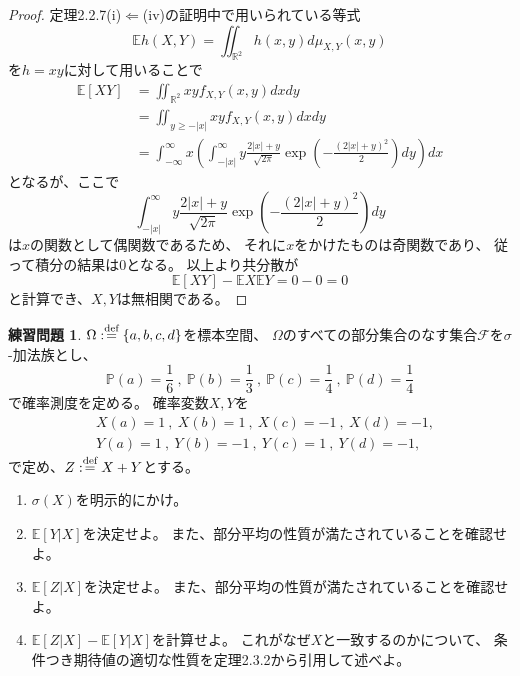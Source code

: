 \documentclass[uplatex]{jsarticle}
\theoremstyle{definition}
\newtheorem{prob}[prob]{練習問題}
\def\R{\mathbb{R}}
\def\P{\mathbb{P}}
\def\E{\mathbb{E}}
\def\mcF{\mathcal{F}}
\def\dfn{:\overset{\mbox{{\scriptsize def}}}{=}}
\begin{document}
\begin{proof}
  定理2.2.7(i)\(\Leftarrow\)(iv)の証明中で用いられている等式
  \[
  \E h(X,Y) = \iint_{\R^2}h(x,y)d\mu_{X,Y}(x,y)
  \]
  を\(h=xy\)に対して用いることで
  \begin{align*}
    \E[XY] &= \iint_{\R^2}xyf_{X,Y}(x,y)dxdy \\
    &= \iint_{y\geq -|x|}xyf_{X,Y}(x,y)dxdy \\
    &= \int_{-\infty}^{\infty}x
    \left( \int_{-|x|}^\infty
    y\frac{2|x| + y}{\sqrt{2\pi}}\exp(-\frac{(2|x|+y)^2}{2})
    dy\right) dx
  \end{align*}
  となるが、ここで
  \[
  \int_{-|x|}^\infty
  y\frac{2|x| + y}{\sqrt{2\pi}}\exp(-\frac{(2|x|+y)^2}{2})
  dy
  \]
  は\(x\)の関数として偶関数であるため、
  それに\(x\)をかけたものは奇関数であり、
  従って積分の結果は\(0\)となる。
  以上より共分散が
  \[
  \E[XY]-\E X \E Y = 0 - 0 = 0
  \]
  と計算でき、\(X,Y\)は無相関である。
\end{proof}


\begin{prob}\label{prob: 2.6}
  \(\Omega \dfn \left\{ a,b,c,d\right\}\)を標本空間、
  \(\Omega\)のすべての部分集合のなす集合\(\mcF\)を\(\sigma\)-加法族とし、
  \[
  \P(a)=\frac{1}{6} \ , \
  \P(b)=\frac{1}{3} \ , \
  \P(c)=\frac{1}{4} \ , \
  \P(d)=\frac{1}{4}
  \]
  で確率測度を定める。
  確率変数\(X,Y\)を
  \begin{align*}
    & X(a) = 1 \ , \
    X(b) = 1 \ , \
    X(c) = -1 \ , \
    X(d) = -1, \\
    & Y(a) = 1 \ , \
    Y(b) = -1 \ , \
    Y(c) = 1 \ , \
    Y(d) = -1,
  \end{align*}
  で定め、\(Z\dfn X+Y\)とする。
  \begin{enumerate}
    \item \label{enumi: 2.6-1}
    \(\sigma(X)\)を明示的にかけ。
    \item \label{enumi: 2.6-2}
    \(\E[Y|X]\)を決定せよ。
    また、部分平均の性質が満たされていることを確認せよ。
    \item \label{enumi: 2.6-3}
    \(\E[Z|X]\)を決定せよ。
    また、部分平均の性質が満たされていることを確認せよ。
    \item \label{enumi: 2.6-4}
    \(\E[Z|X]-\E[Y|X]\)を計算せよ。
    これがなぜ\(X\)と一致するのかについて、
    条件つき期待値の適切な性質を定理2.3.2から引用して述べよ。
  \end{enumerate}
\end{prob}
\end{document}
